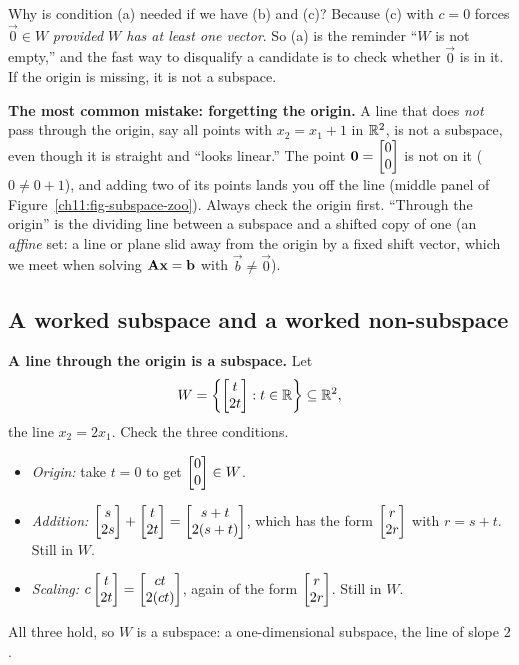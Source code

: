 Why is condition (a) needed if we have (b) and (c)? Because (c) with $c = 0$ forces
$\vec{0}\in W$ \emph{provided $W$ has at least one vector}. So (a) is the
reminder ``$W$ is not empty,'' and the fast way to disqualify a candidate is to check
whether $\vec{0}$ is in it. If the origin is missing, it is not a subspace.

\begin{trapbox}
\textbf{The most common mistake: forgetting the origin.} A line that does \emph{not} pass
through the origin, say all points with $x_2 = x_1 + 1$ in $\mathbb{R}^2$, is not a subspace,
even though it is straight and ``looks linear.'' The point
$\mathbf{0}=\begin{bmatrix}0\\0\end{bmatrix}$ is not on it ($0 \ne 0 + 1$), and adding two of its points lands
you off the line (middle panel of Figure~\ref{ch11:fig-subspace-zoo}). Always check the
origin first. ``Through the origin'' is
the dividing line between a subspace and a shifted copy of one (an \emph{affine} set: a
line or plane slid away from the origin by a fixed shift vector, which we meet
when solving $\mathbf{A}\mathbf{x}=\mathbf{b}$ with $\vec{b}\ne\vec{0}$).
\end{trapbox}

\subsection{A worked subspace and a worked non-subspace}

\begin{example}\label{ch11:line-is-subspace}
\textbf{A line through the origin is a subspace.} Let
\[
W = \left\{ \begin{bmatrix}t\\2t\end{bmatrix} : t\in\mathbb{R} \right\} \subseteq \mathbb{R}^2,
\]
the line $x_2 = 2x_1$. Check the three conditions.
\begin{itemize}
  \item \emph{Origin:} take $t=0$ to get $\begin{bmatrix}0\\0\end{bmatrix}\in W$.
  \item \emph{Addition:} $\begin{bmatrix}s\\2s\end{bmatrix} + \begin{bmatrix}t\\2t\end{bmatrix} = \begin{bmatrix}s+t\\2(s+t)\end{bmatrix}$, which
  has the form $\begin{bmatrix}r\\2r\end{bmatrix}$ with $r = s+t$. Still in $W$.
  \item \emph{Scaling:} $c\begin{bmatrix}t\\2t\end{bmatrix} = \begin{bmatrix}ct\\2(ct)\end{bmatrix}$, again of the form
  $\begin{bmatrix}r\\2r\end{bmatrix}$. Still in $W$.
\end{itemize}
All three hold, so $W$ is a subspace: a one-dimensional subspace, the line of slope $2$.
\end{example}

